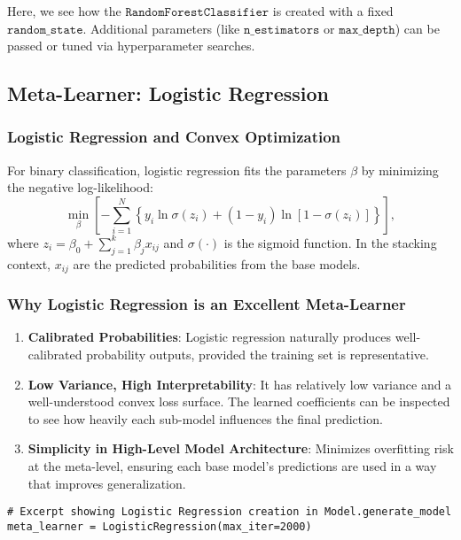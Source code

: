 \documentclass[12pt]{article}
\begin{document}
\noindent Here, we see how the \(\texttt{RandomForestClassifier}\) is created with a fixed \(\texttt{random\_state}\). Additional parameters (like \(\texttt{n\_estimators}\) or \(\texttt{max\_depth}\)) can be passed or tuned via hyperparameter searches.

\subsection{Meta-Learner: Logistic Regression}

\subsubsection{Logistic Regression and Convex Optimization}
For binary classification, logistic regression fits the parameters \(\beta\) by minimizing the negative log-likelihood:
\[
\min_{\beta} \left[ -\sum_{i=1}^N \left\{ y_i \ln \sigma(z_i) + (1 - y_i)\ln [1 - \sigma(z_i)] \right\} \right],
\]
where \(z_i = \beta_0 + \sum_{j=1}^k \beta_j x_{ij}\) and \(\sigma(\cdot)\) is the sigmoid function. In the stacking context, \(x_{ij}\) are the predicted probabilities from the base models.

\subsubsection{Why Logistic Regression is an Excellent Meta-Learner}
\begin{enumerate}[label=\arabic*)]
    \item \textbf{Calibrated Probabilities}: Logistic regression naturally produces well-calibrated probability outputs, provided the training set is representative.
    \item \textbf{Low Variance, High Interpretability}: It has relatively low variance and a well-understood convex loss surface. The learned coefficients can be inspected to see how heavily each sub-model influences the final prediction.
    \item \textbf{Simplicity in High-Level Model Architecture}: Minimizes overfitting risk at the meta-level, ensuring each base model’s predictions are used in a way that improves generalization.
\end{enumerate}

\begin{verbatim}
# Excerpt showing Logistic Regression creation in Model.generate_model
meta_learner = LogisticRegression(max_iter=2000)
\end{verbatim}
\end{document}
